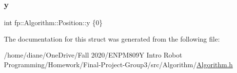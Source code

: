 \subsubsection{\texorpdfstring{y}{y}}
{\footnotesize\ttfamily int fp\+::\+Algorithm\+::\+Position\+::y \{0\}}



The documentation for this struct was generated from the following file\+:\begin{DoxyCompactItemize}
\item 
/home/diane/\+One\+Drive/\+Fall 2020/\+E\+N\+P\+M809\+Y Intro Robot Programming/\+Homework/\+Final-\/\+Project-\/\+Group3/src/\+Algorithm/\hyperlink{_algorithm_8h}{Algorithm.\+h}\end{DoxyCompactItemize}
